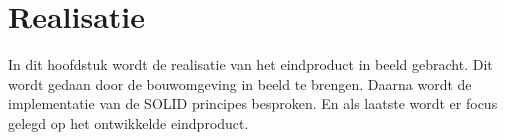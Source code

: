 \chapter{Realisatie}
In dit hoofdstuk wordt de realisatie van het eindproduct in beeld gebracht.
Dit wordt gedaan door de bouwomgeving in beeld te brengen.
Daarna wordt de implementatie van de SOLID principes besproken.
En als laatste wordt  er focus gelegd op het ontwikkelde eindproduct.


\newpage

% 

